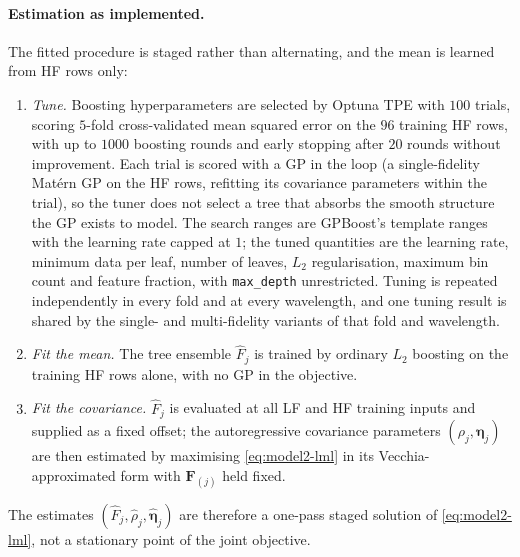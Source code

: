 \documentclass[12pt, letterpaper, oneside]{article}
\begin{document}
\paragraph{Estimation as implemented.} The fitted procedure is staged rather
than alternating, and the mean is learned from HF rows only:
\begin{enumerate}
\itemsep2pt
\item \emph{Tune.} Boosting hyperparameters are selected by Optuna TPE with
$100$ trials, scoring $5$-fold cross-validated mean squared error on the $96$
training HF rows, with up to $1000$ boosting rounds and early stopping after
$20$ rounds without improvement. Each trial is scored with a GP in the loop
(a single-fidelity Matérn GP on the HF rows, refitting its covariance
parameters within the trial), so the tuner does not select a tree that absorbs
the smooth structure the GP exists to model. The search ranges are GPBoost's
template ranges with the learning rate capped at $1$; the tuned quantities are
the learning rate, minimum data per leaf, number of leaves, $L_2$
regularisation, maximum bin count and feature fraction, with
\texttt{max\_depth} unrestricted. Tuning is repeated independently in every
fold and at every wavelength, and one tuning result is shared by the
single- and multi-fidelity variants of that fold and wavelength.
\item \emph{Fit the mean.} The tree ensemble $\widehat F_j$ is trained by
ordinary $L_2$ boosting on the training HF rows alone, with no GP in the
objective.
\item \emph{Fit the covariance.} $\widehat F_j$ is evaluated at all LF and HF
training inputs and supplied as a fixed offset; the autoregressive covariance
parameters $(\rho_j,\bm\eta_j)$ are then estimated by maximising
\eqref{eq:model2-lml} in its Vecchia-approximated form with
$\mathbf{F}_{(j)}$ held fixed.
\end{enumerate}
The estimates $(\widehat F_j,\widehat\rho_j,\widehat{\bm\eta}_j)$ are
therefore a one-pass staged solution of \eqref{eq:model2-lml}, not a
stationary point of the joint objective.
\end{document}
